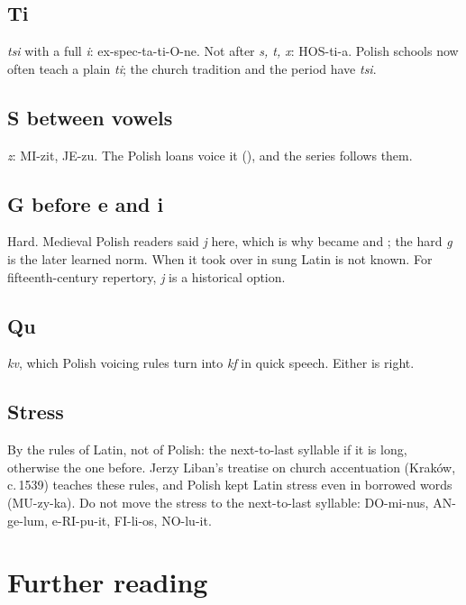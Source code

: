\documentclass[guide]{pol-ren}
\begin{document}
\subsection{Ti} \textit{tsi} with a full \textit{i}: ex-spec-ta-ti-O-ne. Not
after \textit{s, t, x}: HOS-ti-a. Polish schools now often teach a plain
\textit{ti}; the church tradition and the period have \textit{tsi}.

\subsection{S between vowels} \textit{z}: MI-zit, JE-zu. The Polish loans
voice it (), and the series follows them.

\subsection{G before e and i} Hard. Medieval Polish readers said \textit{j}
here, which is why  became  and 
; the hard \textit{g} is the later learned norm. When it took
over in sung Latin is not known. For fifteenth-century repertory, \textit{j}
is a historical option.

\subsection{Qu} \textit{kv}, which Polish voicing rules turn into \textit{kf}
in quick speech. Either is right.

\subsection{Stress} By the rules of Latin, not of Polish: the next-to-last
syllable if it is long, otherwise the one before. Jerzy Liban’s treatise on
church accentuation (Kraków, c.\,1539) teaches these rules, and Polish kept
Latin stress even in borrowed words (MU-zy-ka). Do not move the stress to the
next-to-last syllable: DO-mi-nus, AN-ge-lum, e-RI-pu-it, FI-li-os, NO-lu-it.

\section*{Further reading}
\end{document}
